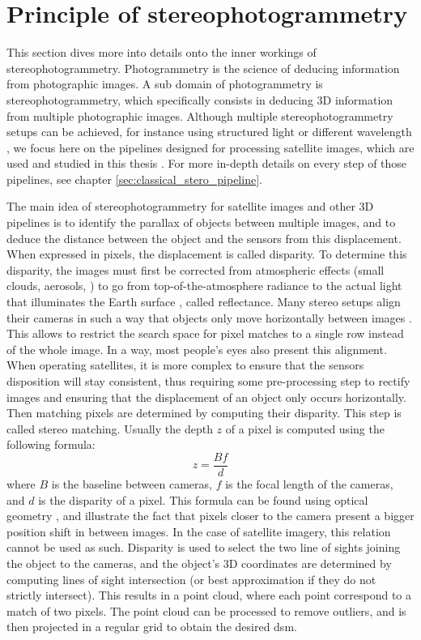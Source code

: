 \section{Principle of stereophotogrammetry}
This section dives more into details onto the inner workings of stereophotogrammetry. Photogrammetry is the science of deducing information from photographic images. A sub domain of photogrammetry is stereophotogrammetry, which specifically consists in deducing 3D information from multiple photographic images. Although multiple stereophotogrammetry setups can be achieved, for instance using structured light \cite{scharstein_high-accuracy_2003} or different wavelength \cite{geng_rainbow_1996}, we focus here on the pipelines designed for processing satellite images, which are used and studied in this thesis \cite{franchis_automatic_2014, shean_automated_2016, rupnik_micmac_2017, michel_new_2020}. For more in-depth details on every step of those pipelines, see chapter \ref{sec:classical_stero_pipeline}.

The main idea of stereophotogrammetry for satellite images and other 3D pipelines is to identify the parallax of objects between multiple images, and to deduce the distance between the object and the sensors from this displacement. When expressed in pixels, the displacement is called disparity. To determine this disparity, the images must first be corrected from atmospheric effects (small clouds, aerosols, \etc) to go from top-of-the-atmosphere radiance to the actual light that illuminates the Earth surface \cite{hagolle_maja_2017}, called reflectance. Many stereo setups align their cameras in such a way that objects only move horizontally between images \cite{geiger_are_2012, scharstein_high-resolution_2014, keselman_intel_2017}. This allows to restrict the search space for pixel matches to a single row instead of the whole image. In a way, most people's eyes also present this alignment. When operating satellites, it is more complex to ensure that the sensors disposition will stay consistent, thus requiring some pre-processing step to rectify images and ensuring that the displacement of an object only occurs horizontally. Then matching pixels are determined by computing their disparity. This step is called stereo matching. Usually the depth $z$ of a pixel is computed using the following formula:
\begin{equation}
    z=\frac{Bf}{d}
\end{equation}
where $B$ is the baseline between cameras, $f$ is the focal length of the cameras, and $d$ is the disparity of a pixel. This formula can be found using optical geometry \cite{bolles_epipolar-plane_1987}, and illustrate the fact that pixels closer to the camera present a bigger position shift in between images. In the case of satellite imagery, this relation cannot be used as such. Disparity is used to select the two line of sights joining the object to the cameras, and the object's 3D coordinates are determined by computing lines of sight intersection (or best approximation if they do not strictly intersect). This results in a point cloud, where each point correspond to a match of two pixels. The point cloud can be processed to remove outliers, and is then projected in a regular grid to obtain the desired \acrshort{dsm}.

